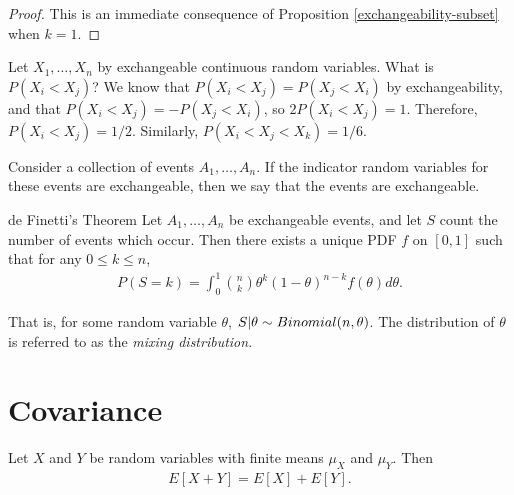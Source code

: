 \begin{proof}
    This is an immediate consequence of Proposition \ref{exchangeability-subset} when $k = 1$.
\end{proof}

\begin{exmp}
    Let $X_1, \ldots, X_n$ by exchangeable continuous random variables. What is $P(X_i < X_j)$? We know that $P(X_i < X_j) = P(X_j < X_i)$ by exchangeability, and that $P(X_i < X_j) =  - P(X_j < X_i)$, so $2P(X_i < X_j) = 1$. Therefore, $P(X_i < X_j) = 1/2$. Similarly, $P(X_i < X_j < X_k) = 1/6$.
\end{exmp}

\begin{defn}
    Consider a collection of events $A_1, \ldots, A_n$. If the indicator random variables for these events are exchangeable, then we say that the events are exchangeable.
\end{defn}

\begin{thm}{de Finetti's Theorem}\label{de-finetti}\proofbreak
    Let $A_1, \ldots, A_n$ be exchangeable events, and let $S$ count the number of events which occur. Then there exists a unique PDF $f$ on $[0, 1]$ such that for any $0 \leq k \leq n$,
    \begin{align*}
        P(S = k) = \int_{0}^{1}\binom{n}{k}\theta^{k}(1-\theta)^{n-k}f(\theta)d\theta.
    \end{align*}

    That is, for some random variable $\theta$, $S | \theta \sim Binomial(n, \theta)$. The distribution of $\theta$ is referred to as the \emph{mixing distribution}.
\end{thm}

\section{Covariance}

\begin{prop}
    Let $X$ and $Y$ be random variables with finite means $\mu_X$ and $\mu_Y$. Then
    \begin{align*}
        E[X + Y] = E[X] + E[Y].
    \end{align*}
\end{prop}

